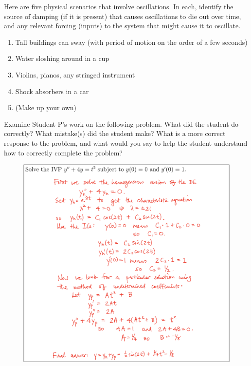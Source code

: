 \begin{problem}[4]
Here are five physical scenarios that involve oscillations. In each, identify the source of damping (if it is present) that causes oscillations to die out over time, and any relevant forcing (inputs) to the system that might cause it to oscillate.

\begin{enumerate}
\item Tall buildings can sway (with period of motion on the order of a few seconds) 
\item Water sloshing around in a cup
\item Violins, pianos, any stringed instrument 
\item Shock absorbers in a car
\item (Make up your own)
\end{enumerate}
\end{problem}

\newpage


\begin{problem}[5]
Examine Student P’s work on the following problem. What did the student do correctly? What mistake(s) did the student make? What is a more correct response to the problem, and what would you say to help the student understand how to correctly complete the problem?
\end{problem}
\begin{figure}[ht!]
\centering
\includegraphics[width=150mm]{6p5.jpg}
\end{figure}

